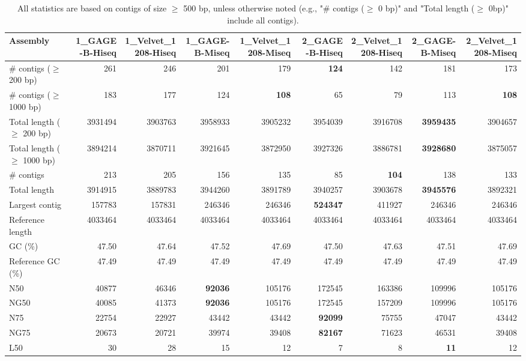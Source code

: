 \documentclass[12pt,a4paper]{article}
\begin{document}
\begin{table}[ht]
\begin{center}
\caption{All statistics are based on contigs of size $\geq$ 500 bp, unless otherwise noted (e.g., "\# contigs ($\geq$ 0 bp)" and "Total length ($\geq$ 0bp)" include all contigs).}
\begin{tabular}{|l*{8}{|r}|}
\hline
Assembly & 1\_GAGE-B-Hiseq & 1\_Velvet\_1208-Hiseq & 1\_GAGE-B-Miseq & 1\_Velvet\_1208-Miseq & 2\_GAGE-B-Hiseq & 2\_Velvet\_1208-Hiseq & 2\_GAGE-B-Miseq & 2\_Velvet\_1208-Miseq \\ \hline
\# contigs ($\geq$ 200 bp) & 261 & 246 & 201 & 179 & {\bf 124} & 142 & 181 & 173 \\ \hline
\# contigs ($\geq$ 1000 bp) & 183 & 177 & 124 & {\bf 108} & 65 & 79 & 113 & {\bf 108} \\ \hline
Total length ($\geq$ 200 bp) & 3931494 & 3903763 & 3958933 & 3905232 & 3954039 & 3916708 & {\bf 3959435} & 3904657 \\ \hline
Total length ($\geq$ 1000 bp) & 3894214 & 3870711 & 3921645 & 3872950 & 3927326 & 3886781 & {\bf 3928680} & 3875057 \\ \hline
\# contigs & 213 & 205 & 156 & 135 & 85 & {\bf 104} & 138 & 133 \\ \hline
Total length & 3914915 & 3889783 & 3944260 & 3891789 & 3940257 & 3903678 & {\bf 3945576} & 3892321 \\ \hline
Largest contig & 157783 & 157831 & 246346 & 246346 & {\bf 524347} & 411927 & 246346 & 246346 \\ \hline
Reference length & 4033464 & 4033464 & 4033464 & 4033464 & 4033464 & 4033464 & 4033464 & 4033464 \\ \hline
GC (\%) & 47.50 & 47.64 & 47.52 & 47.69 & 47.50 & 47.63 & 47.51 & 47.69 \\ \hline
Reference GC (\%) & 47.49 & 47.49 & 47.49 & 47.49 & 47.49 & 47.49 & 47.49 & 47.49 \\ \hline
N50 & 40877 & 46346 & {\bf 92036} & 105176 & 172545 & 163386 & 109996 & 105176 \\ \hline
NG50 & 40085 & 41373 & {\bf 92036} & 105176 & 172545 & 157209 & 109996 & 105176 \\ \hline
N75 & 22754 & 22927 & 43442 & 43442 & {\bf 92099} & 75755 & 47047 & 43442 \\ \hline
NG75 & 20673 & 20721 & 39974 & 39408 & {\bf 82167} & 71623 & 46531 & 39408 \\ \hline
L50 & 30 & 28 & 15 & 12 & 7 & 8 & {\bf 11} & 12 \\ \hline

\end{tabular}
\end{center}
\end{table}
\end{document}
